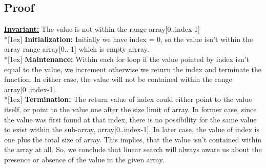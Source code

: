 \documentclass{article}
\begin{document}
\subsection{Proof}

\textbf{\underline{Invariant:}} The value is not within the range
array[0..index-1]
\\*[1ex]
\textbf{Initialization:} Initially we have index = 0, so the value isn't within the array range array[0..-1] which is empty arrray.
\\*[1ex]
\textbf{Maintenance:} Within each for loop if the value pointed by index isn't equal to the value, we increment otherwise we return the index and terminate the function. In either case, the value will not be contained within the range array[0..index-1].
\\*[1ex]
\textbf{Termination:} The return value of index could either point to the value itself, or point to the value one after the size limit of array. In former case, since the value was first found at that index, there is no possibility for the same value to exist within the sub-array, array[0..index-1]. In later case, the value of index is one plus the total size of array. This implies, that the value isn't contained within the array at all.
So, we conclude that linear search will always aware us about the presence or absence of the value in the given array.
\end{document}
